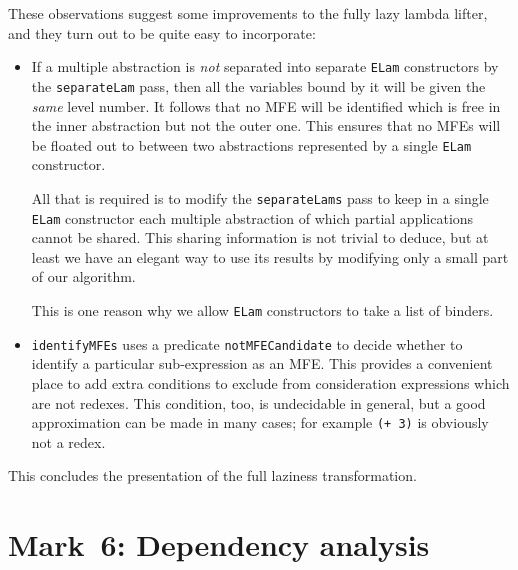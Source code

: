 These observations suggest some improvements to the fully lazy lambda
lifter, and they turn out to be quite easy to incorporate:
\begin{itemize}
\item If a multiple abstraction is {\em not\/} separated into separate
\mbox{\tt ELam} constructors by the \mbox{\tt separateLam} pass, then all the variables
bound by it will be given the {\em same\/} level number.  It follows
that no MFE will be identified which is free in the inner abstraction
but not the outer one.  This ensures that no MFEs will be floated out
to between two abstractions represented by a single \mbox{\tt ELam}
constructor.

All that is required is to modify the \mbox{\tt separateLams} pass to keep in a
single \mbox{\tt ELam} constructor each multiple abstraction of which partial
applications cannot be shared.  This sharing information is not
trivial to deduce, but at least we have an elegant way to use its
results by modifying only a small part of our algorithm.

This is one reason why we allow \mbox{\tt ELam} constructors to take a
list of binders.

\item \mbox{\tt identifyMFEs} uses a predicate \mbox{\tt notMFECandidate} to decide
whether to identify a particular sub-expression as an MFE.  This
provides a convenient place to add extra conditions to exclude from
consideration expressions which are not redexes.  This condition, too,
is undecidable in general, but a good approximation can be made in
many cases; for example \mbox{\tt (+\ 3)} is obviously not a redex.
\end{itemize}

This concludes the presentation of the full laziness transformation.


        \section{Mark~6: Dependency analysis\advanced{}}
        \label{sect:dependency}


